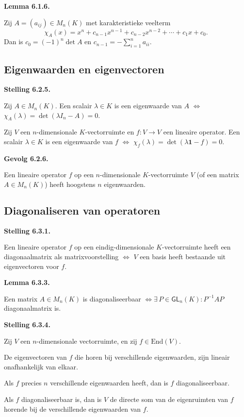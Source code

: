 \documentclass[10pt,a4paper]{article}
\newenvironment{res}[2]{%
  \par\noindent\textbf{#1 #2.}%
}{%
  \par\vspace{2pt}\normalfont
}
\renewcommand{\vec}[1]{\mathbf{#1}}
\begin{document}
\begin{res}{Lemma}{6.1.6}
Zij $A=(a_{ij})\in M_n(K)$ met karakteristieke veelterm
\[
\chi_A(x)=x^n+c_{n-1}x^{n-1}+c_{n-2}x^{n-2}+\cdots+c_1x+c_0.
\]
Dan is $c_0=(-1)^n\det A$ en $c_{n-1}=-\sum_{i=1}^n a_{ii}$.
\end{res}

\subsection{Eigenwaarden en eigenvectoren}
\begin{res}{Stelling}{6.2.5}
\begin{myenum}
\item Zij $A\in M_n(K)$. Een scalair $\lambda\in K$ is een eigenwaarde van $A$ \(\iff\) $\chi_A(\lambda)=\det(\lambda I_n-A)=0$.
\item Zij $V$ een $n$-dimensionale $K$-vectorruimte en $f:V\to V$ een lineaire operator. Een scalair $\lambda\in K$ is een eigenwaarde van $f$ \(\iff\) $\chi_f(\lambda)=\det(\lambda\vec 1-f)=0$.
\end{myenum}
\end{res}

\begin{res}{Gevolg}{6.2.6}
Een lineaire operator $f$ op een $n$-dimensionale $K$-vectorruimte $V$ (of een matrix $A\in M_n(K)$) heeft hoogstens $n$ eigenwaarden.
\end{res}

\subsection{Diagonaliseren van operatoren}
\begin{res}{Stelling}{6.3.1}
Een lineaire operator $f$ op een eindig-dimensionale $K$-vectorruimte heeft een diagonaalmatrix als matrixvoorstelling \(\iff\) $V$ een basis heeft bestaande uit eigenvectoren voor $f$.
\end{res}

\begin{res}{Lemma}{6.3.3}
Een matrix $A\in M_n(K)$ is diagonaliseerbaar \(\iff \exists \,  P\in \mathsf{GL}_n(K) :  P^{-1}AP\) diagonaalmatrix is.
\end{res}

\begin{res}{Stelling}{6.3.4}
Zij $V$ een $n$-dimensionale vectorruimte, en zij $f\in\mathrm{End}(V)$.
\begin{myenum}
\item De eigenvectoren van $f$ die horen bij verschillende eigenwaarden, zijn lineair onafhankelijk van elkaar.
\item Als $f$ precies $n$ verschillende eigenwaarden heeft, dan is $f$ diagonaliseerbaar.
\item Als $f$ diagonaliseerbaar is, dan is $V$ de directe som van de eigenruimten van $f$ horende bij de verschillende eigenwaarden van $f$.
\end{myenum}
\end{res}
\end{document}
